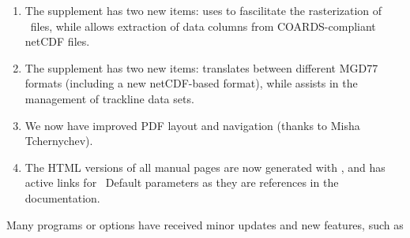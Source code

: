 \begin{enumerate}
\item The  supplement has two new items:  uses  to
fascilitate the rasterization of \PS\ files, while  allows extraction of data columns from
COARDS-compliant netCDF files.
\item The  supplement has two new items:  translates between different
MGD77 formats (including a new netCDF-based format), while  assists in the management
of trackline data sets.
\item We now have improved PDF layout and navigation (thanks to Misha Tchernychev).
\item The HTML versions of all manual pages are now generated with , and has active links
for \GMT\ Default parameters as they are references in the documentation.
\end{enumerate}

Many programs or options have received minor updates and new features, such as

